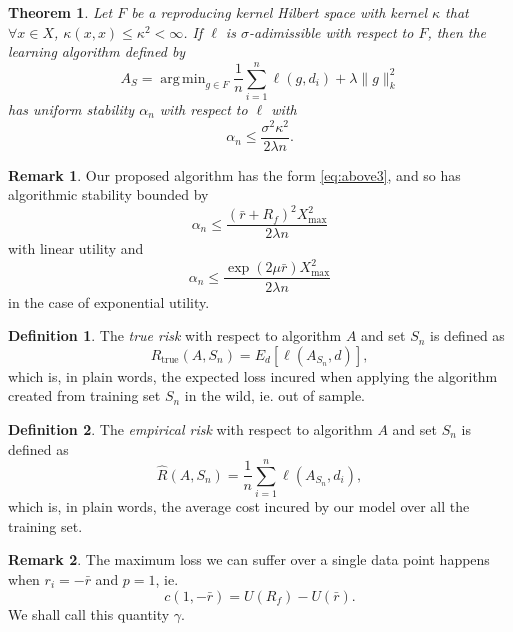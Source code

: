 \documentclass[11pt]{article}
\DeclareMathOperator*{\argmin}{arg\,min}
\theoremstyle{plain}
\newtheorem{thm}{Theorem}
\theoremstyle{definition}
\newtheorem*{deff}{Definition}
\newtheorem*{rem}{Remark}
\begin{document}
\begin{thm}
  Let $F$ be a reproducing kernel Hilbert space with kernel $\kappa$ that
  $\forall x\in X$, $\kappa(x,x) \leq \kappa^2 <\infty$. If $\ell$ is $\sigma$-adimissible
  with respect to $F$, then the learning algorithm defined by
  \begin{equation}
    \label{eq:above3}
    A_S = \argmin_{g\in F}\frac{1}{n}\sum_{i=1}^n \ell(g,d_i) + \lambda\|g\|^2_k
  \end{equation}
  has uniform stability $\alpha_n$ with respect to $\ell$ with
  \begin{equation}
    \alpha_n \leq \frac{\sigma^2 \kappa^2}{2\lambda n}.
  \end{equation}
\end{thm}

\begin{rem}
  Our proposed algorithm has the form \eqref{eq:above3}, and so has algorithmic stability
  bounded by
  \begin{equation}
    \alpha_n \leq \frac{(\bar r+R_f)^2X^2_{\max}}{2\lambda n}
  \end{equation}
  with linear utility and
  \begin{equation}
    \alpha_n \leq \frac{\exp(2\mu\bar r)X^2_{\max}}{2\lambda n}
  \end{equation}
  in the case of exponential utility.
\end{rem}

\begin{deff}
  The \emph{true risk} with respect to algorithm $A$ and set $S_n$ is defined as
  \begin{equation}
    R_{\text{true}}(A,S_n) = E_d[\ell(A_{S_n},d)],
  \end{equation}
  which is, in plain words, the expected loss incured when applying the algorithm created
  from training set $S_n$ in the wild, ie. out of sample.
\end{deff}

\begin{deff}
  The \emph{empirical risk} with respect to algorithm $A$ and set $S_n$ is defined as
  \begin{equation}
    \hat R(A,S_n) = \frac{1}{n} \sum_{i=1}^n \ell(A_{S_n},d_i),
  \end{equation}
  which is, in plain words, the average cost incured by our model over all the training
  set.
\end{deff}

\begin{rem}
  The maximum loss we can suffer over a single data point happens when $r_i=-\bar r$ and
  $p=1$, ie.
  \begin{equation}
    c(1,-\bar r) = U(R_f) - U(\bar r).
  \end{equation}
  We shall call this quantity $\gamma$.
\end{rem}
\end{document}

